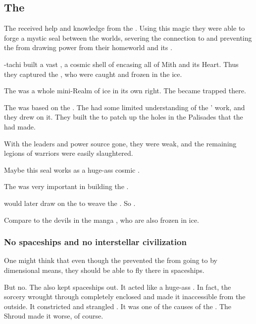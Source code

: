 \subsection{The \CrystalSphere}
\index{\CrystalSphere}
The \ophidians{} received help and knowledge from the \xss{}. 
Using this magic they were able to forge a mystic seal between the worlds, severing the connection to \Erebos{} and preventing the \banes{} from drawing power from their homeworld and its \dweomer. 

\Sethicus-tachi built a vast \CrystalSphere, a cosmic shell of  encasing all of Mith and its Heart. 
Thus they captured the \banelords, who were caught and frozen in the ice. 

The \CrystalSphere{} was a whole mini-Realm of ice in its own right. 
The \banelords{} became trapped there. 

The \CrystalSphere was based on the . 
The \ophidians had some limited understanding of the \voyagers' work, and they drew on it.
They built the \CrystalSphere to patch up the holes in the Palisades that the \banes had made.

With the \pps{\banes}{} leaders and power source gone, they were weak, and the remaining legions of \bane{} warriors were easily slaughtered. 

Maybe this seal works as a huge-ass cosmic . 

The \xs{}  was very important in building the \CrystalSphere. 

\Daggerrain{} would later draw on the \CrystalSphere{} to weave the . 
So . 

Compare to the devils in the manga \cite{NagaiGo:Devilman}, who are also frozen in ice. 





\subsubsection{No spaceships and no interstellar civilization}
One might think that even though the \CrystalSphere{} prevented the \banelords{} from going to \Miith{} by dimensional means, they should be able to fly there in spaceships. 

But no. 
The \CrystalSphere{} also kept spaceships out. 
It acted like a huge-ass . 
In fact, the sorcery wrought through \NaathKurRamalech{} completely enclosed \Miith{} and made it inaccessible from the outside. 
It constricted and strangled \Miith{}. 
It was one of the causes of the . 
The Shroud made it worse, of course. 

